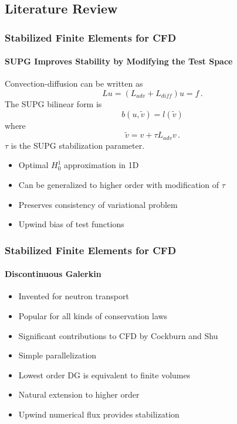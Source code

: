 \documentclass[18pt,xcolor=table]{beamer}
\begin{document}
\subsection{Literature Review}
\begin{frame}[t]
\frametitle{Stabilized Finite Elements for CFD}
\framesubtitle{SUPG Improves Stability by Modifying the Test Space}

Convection-diffusion can be written as
\[
Lu=(L_{adv}+L_{diff})u=f\,.
\]
The SUPG bilinear form is
\[
b(u,\tilde v)=l(\tilde v)
\]
where
\[
\tilde v = v+\tau L_{adv}v\,.
\]
$\tau$ is the SUPG stabilization parameter.
\begin{itemize}
  \item Optimal $H_0^1$ approximation in 1D
  \item Can be generalized to higher order with modification of $\tau$
  \item Preserves consistency of variational problem
  \item Upwind bias of test functions
\end{itemize}

\end{frame}


\begin{frame}[t]
\frametitle{Stabilized Finite Elements for CFD}
\framesubtitle{Discontinuous Galerkin}
\begin{itemize}
  \item Invented for neutron transport
  \item Popular for all kinds of conservation laws
  \item Significant contributions to CFD by Cockburn and Shu
  \item Simple parallelization
  \item Lowest order DG is equivalent to finite volumes
  \item Natural extension to higher order
  \item Upwind numerical flux provides stabilization
\end{itemize}
\end{frame}
\end{document}
